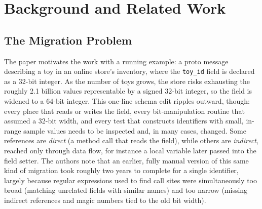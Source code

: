\section{Background and Related Work}

\subsection{The Migration Problem}
The paper motivates the work with a running example: a proto message
describing a toy in an online store's inventory, where the
\texttt{toy\_id} field is declared as a 32-bit integer. As the number
of toys grows, the store risks exhausting the roughly 2.1 billion
values representable by a signed 32-bit integer, so the field is
widened to a 64-bit integer. This one-line schema edit ripples
outward, though: every place that reads or writes the field, every
bit-manipulation routine that assumed a 32-bit width, and every test
that constructs identifiers with small, in-range sample values needs
to be inspected and, in many cases, changed. Some references are
\emph{direct} (a method call that reads the field), while others are
\emph{indirect}, reached only through data flow, for instance a local
variable later passed into the field setter. The authors note that an
earlier, fully manual version of this same kind of migration took
roughly two years to complete for a single identifier, largely
because regular expressions used to find call sites were
simultaneously too broad (matching unrelated fields with similar
names) and too narrow (missing indirect references and magic numbers
tied to the old bit width).



